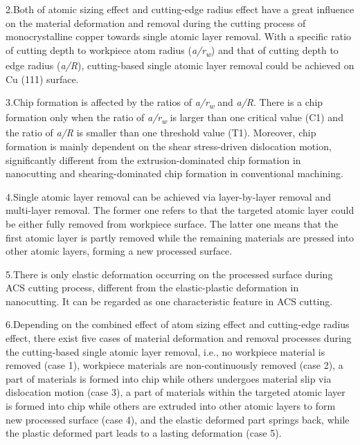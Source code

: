 \documentclass{article}
\begin{document}
\begin{hangpars}
2.\quad Both of atomic sizing effect and cutting-edge radius effect have a great influence on the material deformation and removal during the cutting process of monocrystalline copper towards single atomic layer removal. With a specific ratio of cutting depth to workpiece atom radius (\emph{a/r}\textsubscript{\emph{w}}) and that of cutting depth to edge radius (\emph{a/R}), cutting-based single atomic layer removal could be achieved on Cu (111) surface.

3.\quad Chip formation is affected by the ratios of \emph{a/r}\textsubscript{\emph{w}} and \emph{a/R}. There is a chip formation only when the ratio of \emph{a/r}\textsubscript{\emph{w}} is larger than one critical value (C1) and the ratio of \emph{a/R} is smaller than one threshold value (T1). Moreover, chip formation is mainly dependent on the shear stress-driven dislocation motion, significantly different from the extrusion-dominated chip formation in nanocutting and shearing-dominated chip formation in conventional machining.

4.\quad Single atomic layer removal can be achieved via layer-by-layer removal and multi-layer removal. The former one refers to that the targeted atomic layer could be either fully removed from workpiece surface. The latter one means that the first atomic layer is partly removed while the remaining materials are pressed into other atomic layers, forming a new processed surface.

5.\quad There is only elastic deformation occurring on the processed surface during ACS cutting process, different from the elastic-plastic deformation in nanocutting. It can be regarded as one characteristic feature in ACS cutting.

6.\quad Depending on the combined effect of atom sizing effect and cutting-edge radius effect, there exist five cases of material deformation and removal processes during the cutting-based single atomic layer removal, i.e., no workpiece material is removed (case 1), workpiece materials are non-continuously removed (case 2), a part of materials is formed into chip while others undergoes material slip via dislocation motion (case 3), a part of materials within the targeted atomic layer is formed into chip while others are extruded into other atomic layers to form new processed surface (case 4), and the elastic deformed part springs back, while the plastic deformed part leads to a lasting deformation (case 5).
\end{hangpars}
\end{document}
